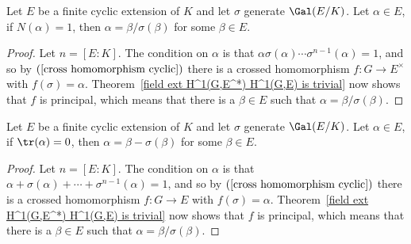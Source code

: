 \begin{corollary}
Let $E$ be a finite cyclic extension of $K$ and let $\sigma$ generate $\Gal(E/K)$. Let $\alpha\in E$, if $N(\alpha)=1$, then $\alpha=\beta/\sigma(\beta)$ for some $\beta\in E$.
\end{corollary}
\begin{proof}
Let $n=[E:K]$. The condition on $\alpha$ is that $\alpha\sigma(\alpha)\cdots\sigma^{n-1}(\alpha)=1$, and so by $(\ref{cross homomorphism cyclic})$ there is a crossed homomorphism $f:G\to E^{\times}$ with $f(\sigma)=\alpha$. Theorem~\ref{field ext H^1(G,E^*) H^1(G,E) is trivial} now shows that $f$ is principal, which means that there is a $\beta\in E$ such that $\alpha=\beta/\sigma(\beta)$.
\end{proof}
\begin{corollary}
Let $E$ be a finite cyclic extension of $K$ and let $\sigma$ generate $\Gal(E/K)$. Let $\alpha\in E$, if $\tr(\alpha)=0$, then $\alpha=\beta-\sigma(\beta)$ for some $\beta\in E$.
\end{corollary}
\begin{proof}
Let $n=[E:K]$. The condition on $\alpha$ is that $\alpha+\sigma(\alpha)+\cdots+\sigma^{n-1}(\alpha)=1$, and so by $(\ref{cross homomorphism cyclic})$ there is a crossed homomorphism $f:G\to E$ with $f(\sigma)=\alpha$. Theorem~\ref{field ext H^1(G,E^*) H^1(G,E) is trivial} now shows that $f$ is principal, which means that there is a $\beta\in E$ such that $\alpha=\beta/\sigma(\beta)$.
\end{proof}
